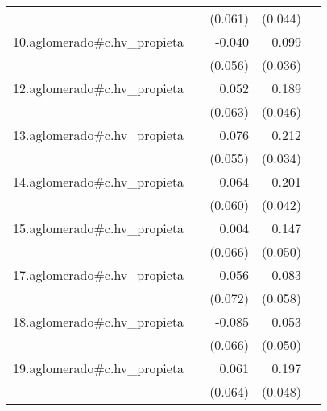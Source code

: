 {\begin{longtable}{l*{4}{D{.}{.}{-1}}}
            &                     &     (0.061)         &     (0.044)         &                     \\
\addlinespace
10.aglomerado#c.hv\_propieta&                     &      -0.040         &       0.099\sym{**} &                     \\
            &                     &     (0.056)         &     (0.036)         &                     \\
\addlinespace
12.aglomerado#c.hv\_propieta&                     &       0.052         &       0.189\sym{***}&                     \\
            &                     &     (0.063)         &     (0.046)         &                     \\
\addlinespace
13.aglomerado#c.hv\_propieta&                     &       0.076         &       0.212\sym{***}&                     \\
            &                     &     (0.055)         &     (0.034)         &                     \\
\addlinespace
14.aglomerado#c.hv\_propieta&                     &       0.064         &       0.201\sym{***}&                     \\
            &                     &     (0.060)         &     (0.042)         &                     \\
\addlinespace
15.aglomerado#c.hv\_propieta&                     &       0.004         &       0.147\sym{**} &                     \\
            &                     &     (0.066)         &     (0.050)         &                     \\
\addlinespace
17.aglomerado#c.hv\_propieta&                     &      -0.056         &       0.083         &                     \\
            &                     &     (0.072)         &     (0.058)         &                     \\
\addlinespace
18.aglomerado#c.hv\_propieta&                     &      -0.085         &       0.053         &                     \\
            &                     &     (0.066)         &     (0.050)         &                     \\
\addlinespace
19.aglomerado#c.hv\_propieta&                     &       0.061         &       0.197\sym{***}&                     \\
            &                     &     (0.064)         &     (0.048)         &                     \\

\end{longtable}}
